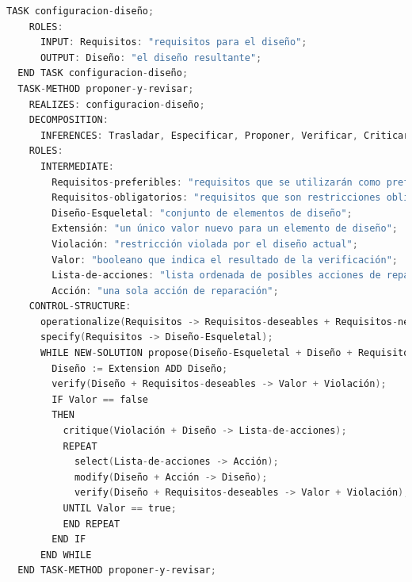 \newpage

\begin{lstlisting}[language=C,caption=\textbf{Código de la plantilla de configuración}]
  TASK configuracion-diseño;
    ROLES:
      INPUT: Requisitos: "requisitos para el diseño";
      OUTPUT: Diseño: "el diseño resultante";
  END TASK configuracion-diseño;
  TASK-METHOD proponer-y-revisar;
    REALIZES: configuracion-diseño;
    DECOMPOSITION:
      INFERENCES: Trasladar, Especificar, Proponer, Verificar, Criticar, Seleccionar, Modificar;
    ROLES:
      INTERMEDIATE:
        Requisitos-preferibles: "requisitos que se utilizarán como preferencias (suaves)";
        Requisitos-obligatorios: "requisitos que son restricciones obligatorias (estrictas)";
        Diseño-Esqueletal: "conjunto de elementos de diseño";
        Extensión: "un único valor nuevo para un elemento de diseño";
        Violación: "restricción violada por el diseño actual";
        Valor: "booleano que indica el resultado de la verificación";
        Lista-de-acciones: "lista ordenada de posibles acciones de reparación (fijación)";
        Acción: "una sola acción de reparación";
    CONTROL-STRUCTURE:
      operationalize(Requisitos -> Requisitos-deseables + Requisitos-necesarios);
      specify(Requisitos -> Diseño-Esqueletal);
      WHILE NEW-SOLUTION propose(Diseño-Esqueletal + Diseño + Requisitos-necesarios -> Extensión) DO
        Diseño := Extension ADD Diseño;
        verify(Diseño + Requisitos-deseables -> Valor + Violación);
        IF Valor == false
        THEN
          critique(Violación + Diseño -> Lista-de-acciones);
          REPEAT
            select(Lista-de-acciones -> Acción);
            modify(Diseño + Acción -> Diseño);
            verify(Diseño + Requisitos-deseables -> Valor + Violación);
          UNTIL Valor == true;
          END REPEAT
        END IF
      END WHILE
  END TASK-METHOD proponer-y-revisar;
\end{lstlisting}


